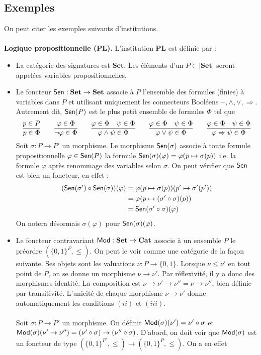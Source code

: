 \documentclass[11pt,a4paper]{article}
\newcommand{\ph}{\varphi}
\newcommand{\itemz}{\item[$\triangleright$]}
\newcommand{\gr}{\textbf}
\newcommand{\info}[1]{\text{{\fontfamily{lmss}\selectfont #1}}}
\newcommand{\Mod}{\info{Mod}}
\newcommand{\Sen}{\info{Sen}}
\newcommand{\1}{\mathbbm{1}}
\begin{document}
\subsection{Exemples}
On peut citer les exemples suivants d'institutions.\\\\
\gr{Logique propositionnelle ($\gr{PL}$).} L'institution $\gr{PL}$ est définie par :
\begin{itemize}
\itemz La catégorie des signatures est $\gr{Set}$. Les éléments d'un $P \in |\gr{Set}|$ seront appelées variables propositionnelles.
\itemz Le foncteur $\Sen : \gr{Set} \to \gr{Set}$ associe à $P$ l'ensemble des formules (finies) à variables dans $P$ et utilisant uniquement les connecteurs Booléens $\neg, \wedge, \vee, \Rightarrow$. Autrement dit, $\Sen(P)$ est le plus petit ensemble de formules $\Phi$ tel que
$$
\infer{p \in \Phi}{p \in P}
\qquad
\infer{\neg \ph \in \Phi}{\ph \in \Phi}
\qquad
\infer{\ph \wedge \psi \in \Phi}{\ph \in \Phi & \psi \in \Phi }
\qquad
\infer{\ph \vee \psi \in \Phi}{\ph \in \Phi & \psi \in \Phi }
\qquad
\infer{\ph \Rightarrow \psi \in \Phi}{\ph \in \Phi & \psi \in \Phi }
$$
Soit $\sigma : P \to P'$ un morphisme. Le morphisme $\Sen(\sigma)$ associe à toute formule propositionnelle $\ph \in \Sen(P)$ la formule $\Sen(\sigma)(\ph) = \ph(p \mapsto \sigma(p))$ i.e. la formule $\ph$ après renommage des variables selon $\sigma$. On peut vérifier que $\Sen$ est bien un foncteur, en effet :
\begin{align*}
 (\Sen(\sigma') \circ \Sen(\sigma)) (\ph) & = \ph(p \mapsto \sigma(p))(p' \mapsto \sigma'(p')) \\ & = \ph(p \mapsto (\sigma' \circ \sigma)(p)) \\ & = \Sen(\sigma' \circ \sigma)(\ph) 
 \end{align*}
On notera désormais $\sigma(\ph)$ pour $\Sen(\sigma)(\ph)$.
\itemz Le foncteur contravariant $\Mod : \gr{Set} \to \gr{Cat}$ associe à un ensemble $P$ le préordre $(\{0,1\}^P, \leq)$. On peut le voir comme une catégorie de la façon suivante. Ses objets sont les valuations $\nu : P \to \{0,1\}$. Lorsque $\nu \leq \nu'$ en tout point de $P$, on se donne un morphisme $\nu \to \nu'$. Par réflexivité, il y a donc des morphismes identité. La composition est $\nu \to \nu' \to \nu'' = \nu \to \nu''$, bien définie par transitivité. L'unicité de chaque morphisme $\nu \to \nu'$ donne automatiquement les conditions $(ii)$ et $(iii)$.\\\\
Soit $\sigma : P \to P'$ un morphisme. On définit $\Mod(\sigma)(\nu') = \nu' \circ \sigma$ et $\Mod(\sigma)(\nu' \to \nu'') = (\nu' \circ \sigma) \to (\nu'' \circ \sigma)$. D'abord, on doit voir que $\Mod(\sigma)$ est un foncteur de type $(\{0,1\}^{P'}, \leq) \to (\{0,1\}^P,\leq)$. On a en effet

\end{itemize}
\end{document}
